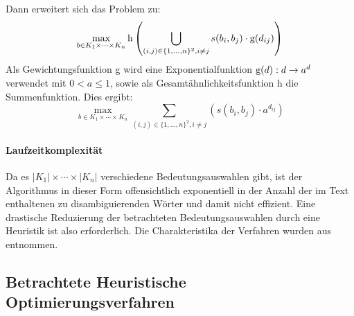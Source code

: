 Dann erweitert sich das Problem zu:
\begin{equation*}
\max_{b\in K_1\times\cdots\times K_n} \textnormal{h}\left(\bigcup_{(i,j) \in \{1,\ldots,n\}^2, i\neq j} s(b_i,b_j) \cdot \textnormal{g}(d_{ij})\right)
\end{equation*}
Als Gewichtungsfunktion g wird eine Exponentialfunktion $\textnormal{g}(d): d\rightarrow a^d$ verwendet mit $0<a\leq1$, sowie als Gesamtähnlichkeitsfunktion h die Summenfunktion.
Dies ergibt:
\begin{equation*}
\max_{b\in K_1\times\cdots\times K_n} \sum_{(i,j) \in \{1,\ldots,n\}^2, i\neq j} \left(s(b_i,b_j) \cdot a^{d_{ij}}\right)
\end{equation*}


\paragraph{Laufzeitkomplexität}
Da es $|K_1|\times\cdots\times |K_n|$ verschiedene Bedeutungsauswahlen gibt, ist der Algorithmus in dieser Form offensichtlich exponentiell in der Anzahl der im Text enthaltenen zu disambiguierenden Wörter
und damit nicht effizient.
Eine drastische Reduzierung der betrachteten Bedeutungsauswahlen durch eine Heuristik ist also erforderlich.
Die Charakteristika der Verfahren wurden aus \cite{global-optimization-algorithms} entnommen.
\subsection{Betrachtete Heuristische Optimierungsverfahren}

